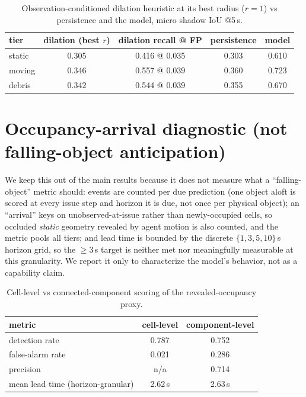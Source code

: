 \documentclass{article}
\begin{document}
\begin{table}[ht]
  \centering
  \small
  \caption{Observation-conditioned dilation heuristic at its best radius ($r{=}1$) vs
  persistence and the model, micro shadow IoU @5\,s.}
  \label{tab:dilate}
  \begin{tabular}{lcccc}
    \toprule
    tier & dilation (best $r$) & dilation recall @ FP & persistence & model \\
    \midrule
    static & 0.305 & 0.416 @ 0.035 & 0.303 & 0.610 \\
    moving & 0.346 & 0.557 @ 0.039 & 0.360 & 0.723 \\
    debris & 0.342 & 0.544 @ 0.039 & 0.355 & 0.670 \\
    \bottomrule
  \end{tabular}
\end{table}

\section{Occupancy-arrival diagnostic (not falling-object anticipation)}
\label{app:falling}

We keep this out of the main results because it does not measure what a ``falling-object'' metric
should: events are counted per due prediction (one object aloft is scored at every issue step and
horizon it is due, not once per physical object); an ``arrival'' keys on unobserved-at-issue
rather than newly-occupied cells, so occluded \emph{static} geometry revealed by agent motion is
also counted, and the metric pools all tiers; and lead time is bounded by the discrete
$\{1,3,5,10\}$\,s horizon grid, so the $\ge$3\,s target is neither met nor meaningfully measurable
at this granularity. We report it only to characterize the model's behavior, not as a capability
claim.

\begin{table}[ht]
  \centering
  \small
  \caption{Cell-level vs connected-component scoring of the revealed-occupancy proxy.}
  \label{tab:falling}
  \begin{tabular}{lcc}
    \toprule
    metric & cell-level & component-level \\
    \midrule
    detection rate & 0.787 & 0.752 \\
    false-alarm rate & 0.021 & 0.286 \\
    precision & n/a & 0.714 \\
    mean lead time (horizon-granular) & 2.62\,s & 2.63\,s \\
    \bottomrule
  \end{tabular}
\end{table}
\end{document}
